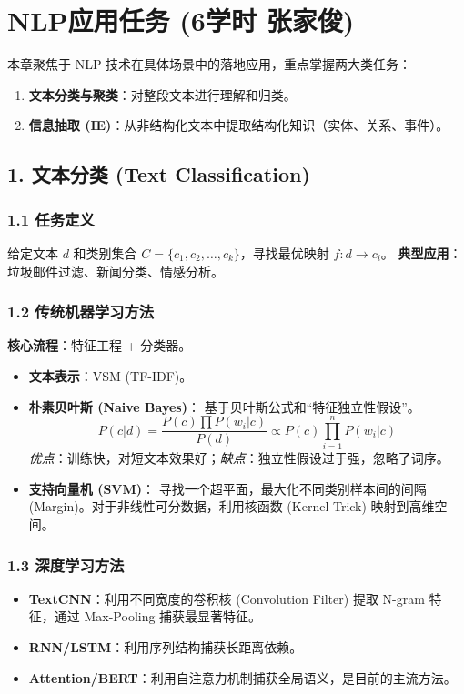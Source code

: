 \documentclass[a4paper, 11pt]{ctexart}
\begin{document}
\section{NLP应用任务 \small{(6学时 张家俊)}}

\begin{note}[本章知识图谱]
本章聚焦于 NLP 技术在具体场景中的落地应用，重点掌握两大类任务：
\begin{enumerate}
    \item \textbf{文本分类与聚类}：对整段文本进行理解和归类。
    \item \textbf{信息抽取 (IE)}：从非结构化文本中提取结构化知识（实体、关系、事件）。
\end{enumerate}
\end{note}

\subsection{1. 文本分类 (Text Classification)}

\subsubsection{1.1 任务定义}
给定文本 $d$ 和类别集合 $C = \{c_1, c_2, \dots, c_k\}$，寻找最优映射 $f: d \to c_i$。
\textbf{典型应用}：垃圾邮件过滤、新闻分类、情感分析。

\subsubsection{1.2 传统机器学习方法}
\textbf{核心流程}：特征工程 + 分类器。
\begin{itemize}
    \item \textbf{文本表示}：VSM (TF-IDF)。
    \item \textbf{朴素贝叶斯 (Naive Bayes)}：
    基于贝叶斯公式和“特征独立性假设”。
    $$ P(c|d) = \frac{P(c) \prod P(w_i|c)}{P(d)} \propto P(c) \prod_{i=1}^n P(w_i|c) $$
    \textit{优点}：训练快，对短文本效果好；\textit{缺点}：独立性假设过于强，忽略了词序。
    \item \textbf{支持向量机 (SVM)}：
    寻找一个超平面，最大化不同类别样本间的间隔 (Margin)。对于非线性可分数据，利用核函数 (Kernel Trick) 映射到高维空间。
\end{itemize}

\subsubsection{1.3 深度学习方法}
\begin{itemize}
    \item \textbf{TextCNN}：利用不同宽度的卷积核 (Convolution Filter) 提取 N-gram 特征，通过 Max-Pooling 捕获最显著特征。
    \item \textbf{RNN/LSTM}：利用序列结构捕获长距离依赖。
    \item \textbf{Attention/BERT}：利用自注意力机制捕获全局语义，是目前的主流方法。
\end{itemize}
\end{document}
